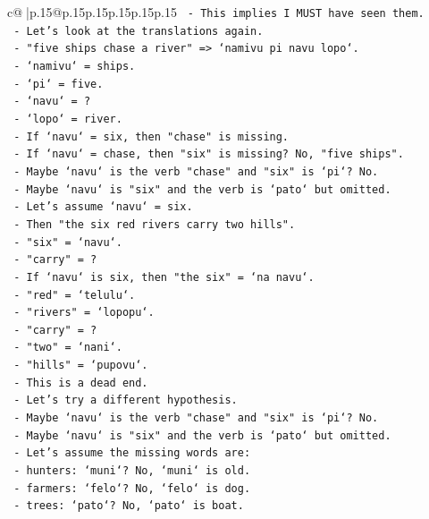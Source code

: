 \documentclass{article}
\begin{document}
{\begin{supertabular}{c@{$\;$}|p{.15\linewidth}@{}p{.15\linewidth}p{.15\linewidth}p{.15\linewidth}p{.15\linewidth}p{.15\linewidth}}
{{{\texttt{  {-} This implies I MUST have seen them.} \\
\texttt{  {-} Let's look at the translations again.} \\
\texttt{  {-} "five ships chase a river" => `namivu pi navu lopo`.} \\
\texttt{    {-} `namivu` = ships.} \\
\texttt{    {-} `pi` = five.} \\
\texttt{    {-} `navu` = ?} \\
\texttt{    {-} `lopo` = river.} \\
\texttt{    {-} If `navu` = six, then "chase" is missing.} \\
\texttt{    {-} If `navu` = chase, then "six" is missing? No, "five ships".} \\
\texttt{    {-} Maybe `navu` is the verb "chase" and "six" is `pi`? No.} \\
\texttt{    {-} Maybe `navu` is "six" and the verb is `pato` but omitted.} \\
\texttt{    {-} Let's assume `navu` = six.} \\
\texttt{    {-} Then "the six red rivers carry two hills".} \\
\texttt{    {-} "six" = `navu`.} \\
\texttt{    {-} "carry" = ?} \\
\texttt{    {-} If `navu` is six, then "the six" = `na navu`.} \\
\texttt{    {-} "red" = `telulu`.} \\
\texttt{    {-} "rivers" = `lopopu`.} \\
\texttt{    {-} "carry" = ?} \\
\texttt{    {-} "two" = `nani`.} \\
\texttt{    {-} "hills" = `pupovu`.} \\
\texttt{  {-} This is a dead end.} \\
\texttt{  {-} Let's try a different hypothesis.} \\
\texttt{  {-} Maybe `navu` is the verb "chase" and "six" is `pi`? No.} \\
\texttt{  {-} Maybe `navu` is "six" and the verb is `pato` but omitted.} \\
\texttt{  {-} Let's assume the missing words are:} \\
\texttt{    {-} hunters: `muni`? No, `muni` is old.} \\
\texttt{    {-} farmers: `felo`? No, `felo` is dog.} \\
\texttt{    {-} trees: `pato`? No, `pato` is boat.} \\
}}}
\end{supertabular}}
\end{document}
